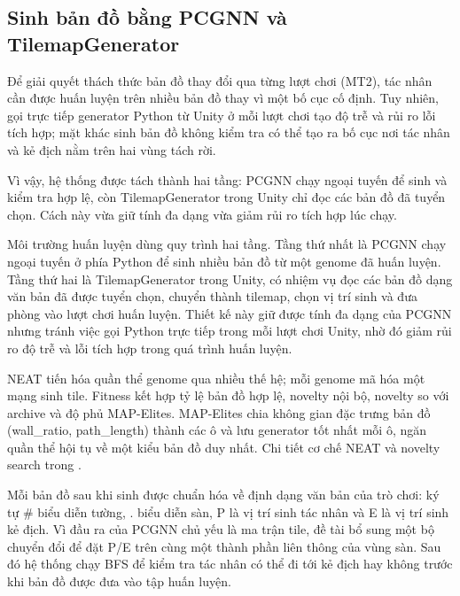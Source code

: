 \subsection{Sinh bản đồ bằng PCGNN và TilemapGenerator}

Để giải quyết thách thức bản đồ thay đổi qua từng lượt chơi (MT2), tác nhân cần được huấn luyện trên nhiều bản đồ thay vì một bố cục cố định. Tuy nhiên, gọi trực tiếp generator Python từ Unity ở mỗi lượt chơi tạo độ trễ và rủi ro lỗi tích hợp; mặt khác sinh bản đồ không kiểm tra có thể tạo ra bố cục nơi tác nhân và kẻ địch nằm trên hai vùng tách rời.

Vì vậy, hệ thống được tách thành hai tầng: PCGNN chạy ngoại tuyến để sinh và kiểm tra hợp lệ, còn TilemapGenerator trong Unity chỉ đọc các bản đồ đã tuyển chọn. Cách này vừa giữ tính đa dạng vừa giảm rủi ro tích hợp lúc chạy.

Môi trường huấn luyện dùng quy trình hai tầng. Tầng thứ nhất là PCGNN chạy ngoại tuyến ở phía Python để sinh nhiều bản đồ từ một genome đã huấn luyện. Tầng thứ hai là TilemapGenerator trong Unity, có nhiệm vụ đọc các bản đồ dạng văn bản đã được tuyển chọn, chuyển thành tilemap, chọn vị trí sinh và đưa phòng vào lượt chơi huấn luyện. Thiết kế này giữ được tính đa dạng của PCGNN nhưng tránh việc gọi Python trực tiếp trong mỗi lượt chơi Unity, nhờ đó giảm rủi ro độ trễ và lỗi tích hợp trong quá trình huấn luyện.

NEAT tiến hóa quần thể genome qua nhiều thế hệ; mỗi genome mã hóa một mạng sinh tile. Fitness kết hợp tỷ lệ bản đồ hợp lệ, novelty nội bộ, novelty so với archive và độ phủ MAP-Elites. MAP-Elites chia không gian đặc trưng bản đồ (wall\_ratio, path\_length) thành các ô và lưu generator tốt nhất mỗi ô, ngăn quần thể hội tụ về một kiểu bản đồ duy nhất. Chi tiết cơ chế NEAT và novelty search trong \cite{Beukman2022}.


Mỗi bản đồ sau khi sinh được chuẩn hóa về định dạng văn bản của trò chơi: ký tự \# biểu diễn tường, . biểu diễn sàn, P là vị trí sinh tác nhân và E là vị trí sinh kẻ địch. Vì đầu ra của PCGNN chủ yếu là ma trận tile, đề tài bổ sung một bộ chuyển đổi để đặt P/E trên cùng một thành phần liên thông của vùng sàn. Sau đó hệ thống chạy BFS để kiểm tra tác nhân có thể đi tới kẻ địch hay không trước khi bản đồ được đưa vào tập huấn luyện.

